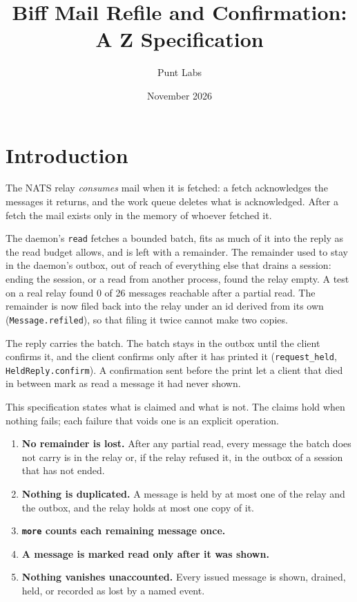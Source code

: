 \documentclass[a4paper,10pt,fleqn]{article}
\begin{document}
\title{Biff Mail Refile and Confirmation: A Z Specification}
\author{Punt Labs}
\date{November 2026}
\maketitle

\section{Introduction}

The NATS relay \emph{consumes} mail when it is fetched: a fetch acknowledges
the messages it returns, and the work queue deletes what is acknowledged.
After a fetch the mail exists only in the memory of whoever fetched it.

The daemon's \texttt{read} fetches a bounded batch, fits as much of it into
the reply as the read budget allows, and is left with a remainder.  The
remainder used to stay in the daemon's outbox, out of reach of everything else
that drains a session: ending the session, or a read from another process,
found the relay empty.  A test on a real relay found 0 of 26 messages
reachable after a partial read.  The remainder is now filed back into the
relay under an id derived from its own (\texttt{Message.refiled}), so that
filing it twice cannot make two copies.

The reply carries the batch.  The batch stays in the outbox until the client
confirms it, and the client confirms only after it has printed it
(\texttt{request\_held}, \texttt{HeldReply.confirm}).  A confirmation sent
before the print let a client that died in between mark as read a message it
had never shown.

This specification states what is claimed and what is not.  The claims hold
when nothing fails; each failure that voids one is an explicit operation.

\begin{enumerate}
  \item \textbf{No remainder is lost.} After any partial read, every message
    the batch does not carry is in the relay or, if the relay refused it,
    in the outbox of a session that has not ended.
  \item \textbf{Nothing is duplicated.} A message is held by at most one of
    the relay and the outbox, and the relay holds at most one copy of it.
  \item \textbf{\texttt{more} counts each remaining message once.}
  \item \textbf{A message is marked read only after it was shown.}
  \item \textbf{Nothing vanishes unaccounted.} Every issued message is shown,
    drained, held, or recorded as lost by a named event.
\end{enumerate}
\end{document}
